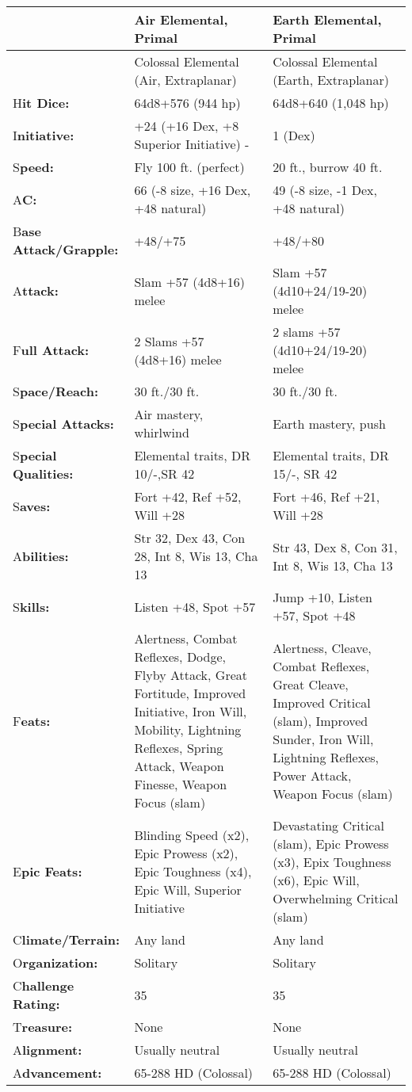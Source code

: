 \documentclass{article}
\begin{document}
\begin{tabular}{|>{\raggedright}p{66pt}|>{\raggedright}p{123pt}|>{\raggedright}p{123pt}|}
\hline
   & A\textbf{ir Elemental, Primal } & E\textbf{arth Elemental, Primal }\tabularnewline
\hline
 & Colossal Elemental (Air, Extraplanar)  & Colossal Elemental (Earth, Extraplanar) 
\tabularnewline
\hline
H\textbf{it Dice:}  & 64d8+576 (944 hp)  & 64d8+640 (1,048 hp) \tabularnewline
\hline
I\textbf{nitiative:}  & +24 (+16 Dex, +8 Superior Initiative) - & 1 (Dex) \tabularnewline
\hline
S\textbf{peed:} & Fly 100 ft. (perfect)  & 20 ft., burrow 40 ft. \tabularnewline
\hline
A\textbf{C:}  & 66 (-8 size, +16 Dex, +48 natural)  & 49 (-8 size, -1 Dex, +48 
natural) \tabularnewline
\hline
B\textbf{ase  Attack/Grapple:} & +48/+75 & +48/+80\tabularnewline
\hline
A\textbf{ttack:} & Slam +57 (4d8+16) melee & Slam +57 (4d10+24/19-20) melee\tabularnewline
\hline
F\textbf{ull Attack:} & 2 Slams +57 (4d8+16) melee & 2 slams +57 (4d10+24/19-20) 
melee\tabularnewline
\hline
S\textbf{pace/Reach:}  & 30 ft./30 ft.  & 30 ft./30 ft. \tabularnewline
\hline
S\textbf{pecial Attacks:}  & Air mastery, whirlwind  & Earth mastery, push \tabularnewline
\hline
S\textbf{pecial Qualities:}  & Elemental traits, DR 10/-,SR 42  & Elemental traits, 
DR 15/-, SR 42 \tabularnewline
\hline
S\textbf{aves:}  & Fort +42, Ref +52, Will +28  & Fort +46, Ref +21, Will +28 \tabularnewline
\hline
A\textbf{bilities:}  & Str 32, Dex 43, Con 28, Int 8, Wis 13, Cha 13  & Str 43, 
Dex 8, Con 31, Int 8, Wis 13, Cha 13 \tabularnewline
\hline
S\textbf{kills:}  & Listen +48, Spot +57 & Jump +10, Listen +57, Spot +48\tabularnewline
\hline
F\textbf{eats:}  & Alertness, Combat Reflexes, Dodge, Flyby Attack, Great Fortitude, 
Improved Initiative, Iron Will, Mobility, Lightning Reflexes, Spring Attack, Weapon 
Finesse, Weapon Focus (slam)  & Alertness, Cleave, Combat Reflexes, Great Cleave, 
Improved Critical (slam), Improved Sunder, Iron Will, Lightning Reflexes, Power 
Attack, Weapon Focus (slam)\tabularnewline
\hline
E\textbf{pic Feats:}  & Blinding Speed (x2), Epic Prowess (x2), Epic Toughness 
(x4), Epic Will, Superior Initiative & Devastating Critical (slam), Epic Prowess 
(x3), Epix Toughness (x6), Epic Will, Overwhelming Critical (slam) \tabularnewline
\hline
C\textbf{limate/Terrain:}  & Any land  & Any land \tabularnewline
\hline
O\textbf{rganization:}  & Solitary  & Solitary \tabularnewline
\hline
C\textbf{hallenge Rating:}  & 35  & 35 \tabularnewline
\hline
T\textbf{reasure:}  & None  & None \tabularnewline
\hline
A\textbf{lignment:}  & Usually neutral  & Usually neutral \tabularnewline
\hline
A\textbf{dvancement:}  & 65-288 HD (Colossal)  & 65-288 HD (Colossal) \tabularnewline
\hline
\end{tabular}
\end{document}
